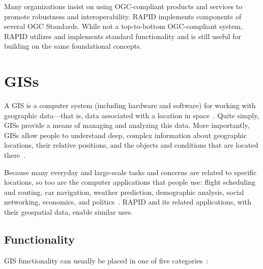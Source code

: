 Many organizations insist on using OGC-compliant products and services to promote robustness and interoperability. RAPID implements components of several OGC Standards. While not a top-to-bottom OGC-compliant system, RAPID utilizes and implements standard functionality and is still useful for building on the same foundational concepts.

\section{GISs}
A GIS is a computer system (including hardware and software) for working with geographic data---that is, data associated with a location in space~\cite{Esriintro}. Quite simply, GISs provide a means of managing and analyzing this data. More importantly, GISs allow people to understand deep, complex information about geographic locations, their relative positions, and the objects and conditions that are located there~\cite{Esriintro}.

Because many everyday and large-scale tasks and concerns are related to specific locations, so too are the computer applications that people use: flight scheduling and routing, car navigation, weather prediction, demographic analysis, social networking, economics, and politics~\cite{Esriintro}. RAPID and its related applications, with their geospatial data, enable similar uses.

\subsection{Functionality}
GIS functionality can usually be placed in one of five categories~\cite{Esriintro}:

